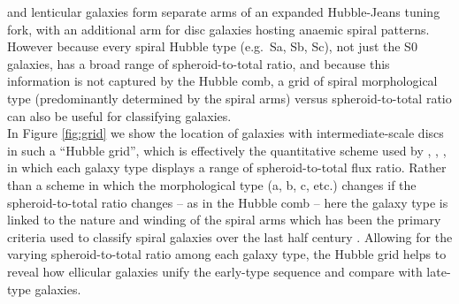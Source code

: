 \documentclass[useAMS,usenatbib,article]{mn2e}
\begin{document}
and lenticular galaxies form separate arms of an expanded Hubble-Jeans tuning
fork, with an additional arm for disc galaxies hosting anaemic spiral
patterns.  However because every spiral Hubble type (e.g.~Sa, Sb, Sc), not just the S0 galaxies, 
has a broad range of spheroid-to-total ratio, and because this information is not captured by the Hubble comb, 
a grid of spiral morphological type (predominantly determined by the spiral
arms) versus spheroid-to-total ratio can also be useful for classifying galaxies.  \\
In Figure \ref{fig:grid} we show the location of galaxies with intermediate-scale
discs in such a ``Hubble grid'', which is effectively the quantitative scheme used by  
\cite{boroson1981}, \cite{kent1985}, \cite{kodaira1986}, \cite{simiendevaucouleurs1986} 
in which each galaxy type displays a range of spheroid-to-total flux ratio.
Rather than a scheme in which the morphological type (a, b, c,
etc.) changes if the spheroid-to-total ratio changes -- as in the Hubble comb -- here
the galaxy type is linked to the nature and winding of the spiral arms
which has been the primary criteria used to classify spiral galaxies
over the last half century \citep{sandage1961}.  
Allowing for the varying spheroid-to-total ratio among each galaxy type, 
the Hubble grid helps to reveal how ellicular galaxies unify the early-type sequence and compare with late-type galaxies. 
\end{document}
